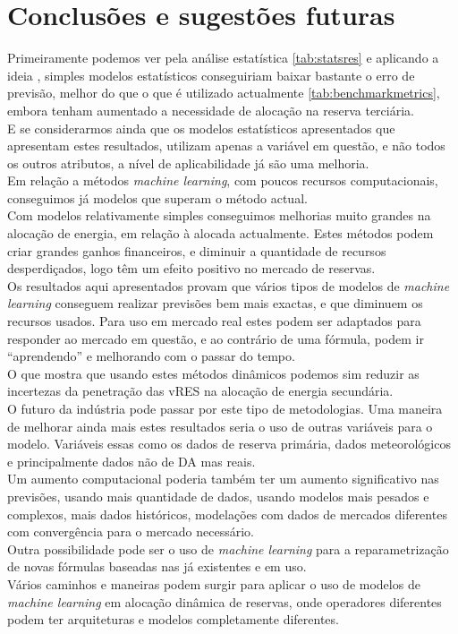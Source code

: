 \chapter{Conclusões e sugestões futuras}

Primeiramente podemos ver pela análise estatística \ref{tab:statsres} e aplicando a ideia \cite{Elsayed}, simples modelos estatísticos conseguiriam baixar bastante o erro de previsão, melhor do que o que é utilizado actualmente \ref{tab:benchmarkmetrics}, embora tenham aumentado a necessidade de alocação na reserva terciária.\\
E se considerarmos ainda que os modelos estatísticos apresentados que apresentam estes resultados, utilizam apenas a variável em questão, e não todos os outros atributos, a nível de aplicabilidade já são uma melhoria. \\
Em relação a métodos \textit{machine learning}, com poucos recursos computacionais, conseguimos já modelos que superam o método actual.\\
Com modelos relativamente simples conseguimos melhorias muito grandes na alocação de energia, em relação à alocada actualmente. Estes métodos podem criar grandes ganhos financeiros, e diminuir a quantidade de recursos desperdiçados, logo têm um efeito positivo no mercado de reservas.\\
Os resultados aqui apresentados provam que vários tipos de modelos de \textit{machine learning} conseguem realizar previsões bem mais exactas, e que diminuem os recursos usados. Para uso em mercado real estes podem ser adaptados para responder ao mercado em questão, e ao contrário de uma fórmula, podem ir “aprendendo” e melhorando com o passar do tempo.\\
O que mostra que usando estes métodos dinâmicos podemos sim reduzir as incertezas da penetração das \gls{vRES} na alocação de energia secundária.\\
O futuro da indústria pode passar por este tipo de metodologias. Uma maneira de melhorar ainda mais estes resultados seria o uso de outras variáveis para o modelo. Variáveis essas como os dados de reserva primária, dados meteorológicos e principalmente dados não de \gls{DA} mas reais.\\
Um aumento computacional poderia também ter um aumento significativo nas previsões, usando mais quantidade de dados, usando modelos mais pesados e complexos, mais dados históricos, modelações com dados de mercados diferentes com convergência para o mercado necessário.\\
Outra possibilidade pode ser o uso de \textit{machine learning} para a reparametrização de novas fórmulas baseadas nas já existentes e em uso.\\
Vários caminhos e maneiras podem surgir para aplicar o uso de modelos de \textit{machine learning} em alocação dinâmica de reservas, onde operadores diferentes podem ter arquiteturas e modelos completamente diferentes.
